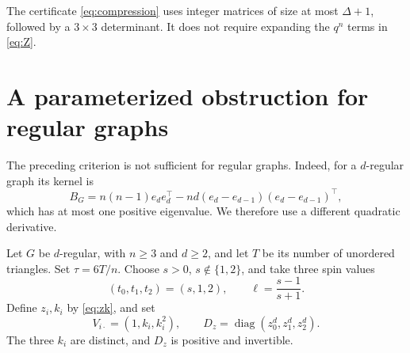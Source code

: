 \documentclass[11pt]{article}
\theoremstyle{remark}
\DeclareMathOperator{\diag}{diag}
\begin{document}
The certificate \eqref{eq:compression} uses integer matrices of size
at most $\Delta+1$, followed by a $3\times3$ determinant. It does not
require expanding the $q^n$ terms in \eqref{eq:Z}.

\section{A parameterized obstruction for regular graphs}
The preceding criterion is not sufficient for regular graphs.
Indeed, for a $d$-regular graph its kernel is
\begin{equation}
 B_G=n(n-1)e_de_d^\top
       -nd(e_d-e_{d-1})(e_d-e_{d-1})^\top,             \label{eq:regularfirst}
\end{equation}
which has at most one positive eigenvalue.
We therefore use a different quadratic derivative.

Let $G$ be $d$-regular, with $n\geq3$ and $d\geq2$, and let $T$
be its number of unordered triangles. Set $\tau=6T/n$.
Choose $s>0$, $s\notin\{1,2\}$, and take three spin values
\[
 (t_0,t_1,t_2)=(s,1,2),\qquad
 \ell=\frac{s-1}{s+1}.
\]
Define $z_i,k_i$ by \eqref{eq:zk}, and set
\[
 V_{i\cdot}=(1,k_i,k_i^2),\qquad
 D_z=\diag(z_0^d,z_1^d,z_2^d).
\]
The three $k_i$ are distinct, and $D_z$ is positive and invertible.
\end{document}
